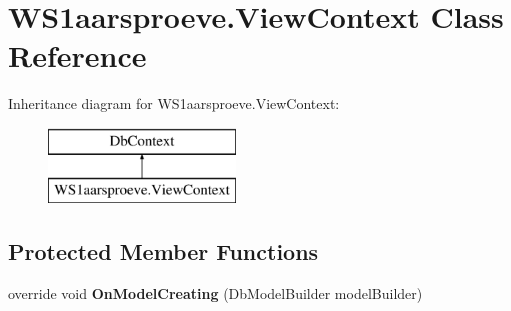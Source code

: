 \hypertarget{class_w_s1aarsproeve_1_1_view_context}{}\section{W\+S1aarsproeve.\+View\+Context Class Reference}
\label{class_w_s1aarsproeve_1_1_view_context}
Inheritance diagram for W\+S1aarsproeve.\+View\+Context\+:\begin{figure}[H]
\begin{center}
\leavevmode
\includegraphics[height=2.000000cm]{class_w_s1aarsproeve_1_1_view_context}
\end{center}
\end{figure}
\subsection*{Protected Member Functions}
\begin{DoxyCompactItemize}
\item 
\hypertarget{class_w_s1aarsproeve_1_1_view_context_a7429c5031704ff1bc21ecc860a92d129}{}override void {\bfseries On\+Model\+Creating} (Db\+Model\+Builder model\+Builder)\label{class_w_s1aarsproeve_1_1_view_context_a7429c5031704ff1bc21ecc860a92d129}

\end{DoxyCompactItemize}
